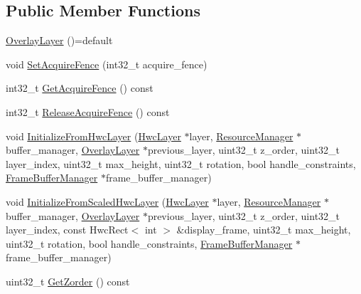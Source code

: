 \subsection*{Public Member Functions}
\begin{DoxyCompactItemize}
\item 
\mbox{\hyperlink{structhwcomposer_1_1OverlayLayer_a80f13ea2a0d871dfd0dd568cfd0e8319}{Overlay\+Layer}} ()=default
\item 
void \mbox{\hyperlink{structhwcomposer_1_1OverlayLayer_ab6058186fdd91bd43be0abfd37e8ee97}{Set\+Acquire\+Fence}} (int32\+\_\+t acquire\+\_\+fence)
\item 
int32\+\_\+t \mbox{\hyperlink{structhwcomposer_1_1OverlayLayer_a19ca69df451baec46beb353455ef8a3c}{Get\+Acquire\+Fence}} () const
\item 
int32\+\_\+t \mbox{\hyperlink{structhwcomposer_1_1OverlayLayer_a674ab0a44edfb514789eecbee56740e1}{Release\+Acquire\+Fence}} () const
\item 
void \mbox{\hyperlink{structhwcomposer_1_1OverlayLayer_a22fbb88a9bbb316dbf2ca2195025a1fa}{Initialize\+From\+Hwc\+Layer}} (\mbox{\hyperlink{structhwcomposer_1_1HwcLayer}{Hwc\+Layer}} $\ast$layer, \mbox{\hyperlink{classhwcomposer_1_1ResourceManager}{Resource\+Manager}} $\ast$buffer\+\_\+manager, \mbox{\hyperlink{structhwcomposer_1_1OverlayLayer}{Overlay\+Layer}} $\ast$previous\+\_\+layer, uint32\+\_\+t z\+\_\+order, uint32\+\_\+t layer\+\_\+index, uint32\+\_\+t max\+\_\+height, uint32\+\_\+t rotation, bool handle\+\_\+constraints, \mbox{\hyperlink{classhwcomposer_1_1FrameBufferManager}{Frame\+Buffer\+Manager}} $\ast$frame\+\_\+buffer\+\_\+manager)
\item 
void \mbox{\hyperlink{structhwcomposer_1_1OverlayLayer_a2b42eb88747d7d48e7e35c10f157cc79}{Initialize\+From\+Scaled\+Hwc\+Layer}} (\mbox{\hyperlink{structhwcomposer_1_1HwcLayer}{Hwc\+Layer}} $\ast$layer, \mbox{\hyperlink{classhwcomposer_1_1ResourceManager}{Resource\+Manager}} $\ast$buffer\+\_\+manager, \mbox{\hyperlink{structhwcomposer_1_1OverlayLayer}{Overlay\+Layer}} $\ast$previous\+\_\+layer, uint32\+\_\+t z\+\_\+order, uint32\+\_\+t layer\+\_\+index, const Hwc\+Rect$<$ int $>$ \&display\+\_\+frame, uint32\+\_\+t max\+\_\+height, uint32\+\_\+t rotation, bool handle\+\_\+constraints, \mbox{\hyperlink{classhwcomposer_1_1FrameBufferManager}{Frame\+Buffer\+Manager}} $\ast$frame\+\_\+buffer\+\_\+manager)
\item 
uint32\+\_\+t \mbox{\hyperlink{structhwcomposer_1_1OverlayLayer_af0be53d937271403f4d883efced4a22f}{Get\+Zorder}} () const

\end{DoxyCompactItemize}
